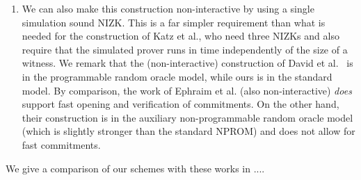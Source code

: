 \begin{enumerate}
\item{} We can also make this construction non-interactive by using a single simulation sound NIZK. This is a far simpler requirement than what is needed for the construction of Katz et al., who need three NIZKs and also require that the simulated prover runs in time independently of the size of a witness. We remark that the (non-interactive) construction of David et al.~\cite{EC:BDDNO21} is in the programmable random oracle model, while ours is in the standard model. By comparison, the work of Ephraim et al. \cite{EPRINT:EFKP20a} (also non-interactive) \emph{does} support fast opening and verification of commitments. On the other hand, their construction is in the auxiliary non-programmable random oracle model (which is slightly stronger than the standard NPROM) and does not allow for fast commitments.
\end{enumerate}

We give a comparison of our schemes with these works in ....




